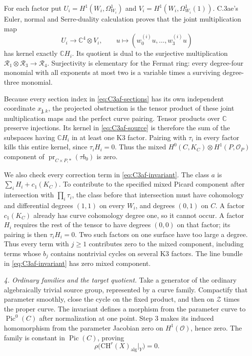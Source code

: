For each factor put
$U_i=H^1(W_i,\Omega^1_{W_i})$ and
$V_i=H^1(W_i,\Omega^1_{W_i}(1))$. C.3ae's Euler,
normal and Serre-duality calculation proves that
the joint multiplication map
\[
 U_i\longrightarrow\mathbb C^4\otimes V_i,
       \qquad u\longmapsto(w^{(i)}_0u,\ldots,w^{(i)}_3u)
\]
has kernel exactly $\mathbb C H_i$. Its quotient
is dual to the surjective multiplication
$\mathcal R_1\otimes\mathcal R_3\to\mathcal R_4$.
Surjectivity is elementary for the Fermat ring:
every degree-four monomial with all exponents at
most two is a variable times a surviving
degree-three monomial.

Because every section index in
\eqref{eq:C3af-sections} has its own independent
coordinate $x_{\mathbf j,k}$, the projected obstruction
is the tensor product of these joint multiplication
maps and the perfect curve pairing. Tensor products
over $\mathbb C$ preserve injections. Its kernel in
\eqref{eq:C3af-source} is therefore the sum of the
subspaces having $\mathbb C H_i$ in at least one
K3 factor. Pairing with $\tau_i$ in every factor
kills this entire kernel, since $\tau_iH_i=0$.
Thus the mixed $H^0(C,K_C)\otimes H^1(P,\mathcal O_P)$
component of $\operatorname{pr}_{C\times P,*}(\tau b_0)$
is zero.

We also check every correction term in
\eqref{eq:C3af-invariant}. The class $a$ is
$\sum_iH_i+c_1(K_C)$. To contribute to the specified
mixed Picard component after intersection with
$\prod_i\tau_i$, the class before that intersection
must have cohomology and differential degrees $(1,1)$
on every $W_i$, and degrees $(0,1)$ on $C$.
A factor $c_1(K_C)$ already has curve cohomology
degree one, so it cannot occur. A factor $H_i$
requires the rest of the tensor to have degrees
$(0,0)$ on that factor; its pairing is then
$\tau_iH_i=0$. Two such factors on one surface
have too large a degree. Thus every term with
$j\ge1$ contributes zero to the mixed component,
including terms whose $b_j$ contains nontrivial
cycles on several K3 factors. The line bundle
in \eqref{eq:C3af-invariant} has zero mixed
component.

\emph{4. Ordinary families and the target quotient.}
Take a generator of the ordinary algebraically
trivial source group, represented by a curve family.
Compactify that parameter smoothly, close the
cycle on the fixed product, and then on
$\mathcal Z$ times the proper curve. The invariant
defines a morphism from the parameter curve to
$\operatorname{Pic}^0(C)$ after normalization at
one point. Step 3 makes its induced homomorphism
from the parameter Jacobian zero on
$H^1(\mathcal O)$, hence zero. The family is
constant in $\operatorname{Pic}(C)$, proving
\[
             \rho\bigl(\mathrm{CH}^r(X)_{\mathrm{alg}}|_Y\bigr)=0.
\]

